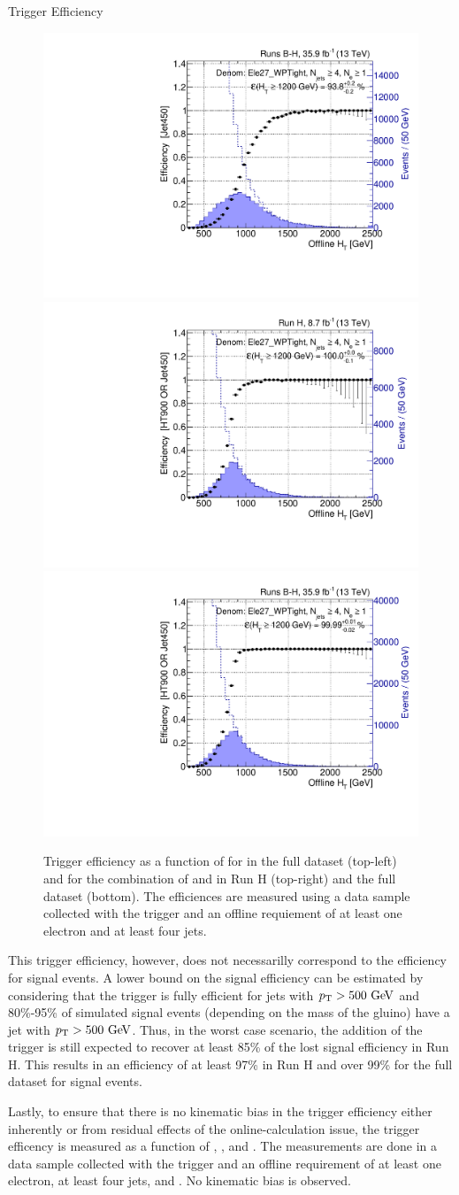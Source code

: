 \begin{section}{Trigger Efficiency}
\begin{figure}[tbp!]
\centering
\includegraphics[angle=0,width=0.45\columnwidth]{fig/trig_jet_runsbh.pdf}
\includegraphics[angle=0,width=0.45\columnwidth]{fig/trig_ht_jet_runh.pdf}
\includegraphics[angle=0,width=0.45\columnwidth]{fig/trig_ht_jet_runsbh.pdf}
\caption{Trigger efficiency as a function of \HT for \trigJet in the full dataset (top-left) and for the combination of \trigHT and \trigJet in Run H (top-right) and the full dataset (bottom).
The efficiences are measured using a data sample collected with the \trigEle trigger and an offline requiement of at least one electron and at least four jets.}
\label{fig:ht_jet_trigger}
\end{figure}

This trigger efficiency, however, does not necessarilly correspond to the efficiency for signal events.
A lower bound on the signal efficiency can be estimated by considering that the \trigJet trigger is fully efficient for jets with $p_{\mathrm{T}} > 500~\mathrm{Ge\kern -0.1em V}$ and 80\%-95\% of simulated signal events (depending on the mass of the gluino) have a jet with $p_{\mathrm{T}} > 500~\mathrm{Ge\kern -0.1em V}$.
Thus, in the worst case scenario, the addition of the \trigJet trigger is still expected to recover at least 85\% of the lost signal efficiency in Run H.
This results in an efficiency of at least 97\% in Run H and over 99\% for the full dataset for signal events.

Lastly, to ensure that there is no kinematic bias in the trigger efficiency either inherently or from residual effects of the online-\HT calculation issue, the trigger efficency is measured as a function of \MJ, \Njets, and \Nb.
The measurements are done in a data sample collected with the \trigEle trigger and an offline requirement of at least one electron, at least four jets, and \baseHT.
No kinematic bias is observed.

\end{section}

